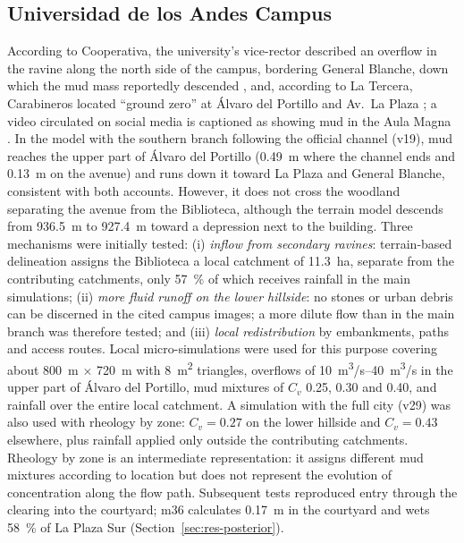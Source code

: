 \subsection{Universidad de los Andes Campus}\label{sec:res-campus}
According to Cooperativa, the university's vice-rector described an overflow in the ravine along the north side of the campus, bordering General Blanche, down which the mud mass reportedly descended \citep{cooperativa2026}, and, according to La Tercera, Carabineros located ``ground zero'' at Álvaro del Portillo and Av.\ La Plaza \citep{latercera2026zonacero}; a video circulated on social media is captioned as showing mud in the Aula Magna \citep{quintaconectado2026}. In the model with the southern branch following the official channel (v19), mud reaches the upper part of Álvaro del Portillo (\SI{0.49}{m} where the channel ends and \SI{0.13}{m} on the avenue) and runs down it toward La Plaza and General Blanche, consistent with both accounts. However, it does not cross the woodland separating the avenue from the Biblioteca, although the terrain model descends from \SI{936.5}{m} to \SI{927.4}{m} toward a depression next to the building. Three mechanisms were initially tested: (i) \emph{inflow from secondary ravines}: terrain-based delineation assigns the Biblioteca a local catchment of \SI{11.3}{ha}, separate from the contributing catchments, only \SI{57}{\percent} of which receives rainfall in the main simulations; (ii) \emph{more fluid runoff on the lower hillside}: no stones or urban debris can be discerned in the cited campus images; a more dilute flow than in the main branch was therefore tested; and (iii) \emph{local redistribution} by embankments, paths and access routes. Local micro-simulations were used for this purpose covering about \SI{800}{m} $\times$ \SI{720}{m} with \SI{8}{m^2} triangles, overflows of \SIrange{10}{40}{m^3/s} in the upper part of Álvaro del Portillo, mud mixtures of $C_v$ 0.25, 0.30 and 0.40, and rainfall over the entire local catchment. A simulation with the full city (v29) was also used with rheology by zone: $C_v=0.27$ on the lower hillside and $C_v=0.43$ elsewhere, plus rainfall applied only outside the contributing catchments. Rheology by zone is an intermediate representation: it assigns different mud mixtures according to location but does not represent the evolution of concentration along the flow path. Subsequent tests reproduced entry through the clearing into the courtyard; m36 calculates \SI{0.17}{m} in the courtyard and wets \SI{58}{\percent} of La Plaza Sur (Section~\ref{sec:res-posterior}).

